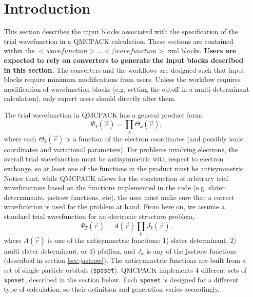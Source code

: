 \section{Introduction}
\label{sec:intro_wavefunction}

This section describes the input blocks associated with the specification of the trial wavefunction in a QMCPACK calculation. These sections are contained within the $<wavefunction > ...  </wavefunction>$ xml blocks. \textbf{Users are expected to rely on converters to generate the input blocks described in this section.} The converters and the workflows are designed such that input blocks require minimum modifications from users. Unless the workflow requires modification of wavefunction blocks (e.g. setting the cutoff in a multi determinant calculation), only expert users should directly alter them.
  
The trial wavefunction in QMCPACK has a general product form:
\begin{equation}
\Psi_T(\vec{r}) = \prod_k \Theta_k(\vec{r}),
\end{equation}
where each $\Theta_k(\vec{r})$ is a function of the electron coordinates (and possibly ionic coordinates and variational parameters). For problems involving electrons, the overall trial wavefunction must be antisymmetric with respect to electron exchange, so at least one of the functions in the product must be antisymmetric. Notice that, while QMCPACK allows for the construction of arbitrary trial wavefunctions based on the functions implemented in the code (e.g. slater determinants, jastrow functions, etc), the user must make sure that a correct wavefunction is used for the problem at hand. From here on, we assume a standard trial wavefunction for an electronic structure problem, 
\begin{equation}
\Psi_T(\vec{r}) =  \textit{A}(\vec{r}) \prod_k \textit{J}_k(\vec{r}),
\end{equation}
where $\textit{A}(\vec{r})$ is one of the antisymmetric functions: 1) slater determinant, 2) multi slater determinant, or 3) pfaffian, and $\textit{J}_k$ is any of the jastrow functions (described in section \ref{sec:jastrow}).  The antisymmetric functions are built from a set of single particle orbitals (\texttt{sposet}). QMCPACK implements 4 different sets of \texttt{sposet}, described in the section below. Each \texttt{sposet} is designed for a different type of calculation, so their definition and generation varies accordingly. 
